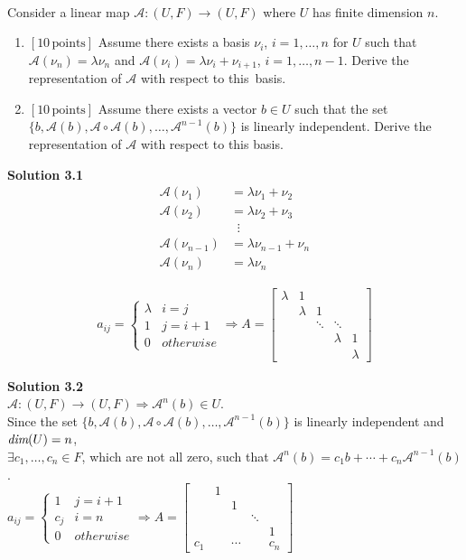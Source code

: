 \documentclass[a4paper,10.5pt]{article}
\def\dim{{\mbox{\em dim}}}
\newcommand{\A}{\mathcal{A}}
\begin{document}
\\
Consider a linear map $\A:(U,F) \rightarrow (U,F)$
where $U$ has finite dimension $n$. 
\begin{enumerate}
	\item {\bf$[10\, \text{points}]$} Assume there exists a basis
	$\nu_i$, $i=1, \ldots, n$ for $U$ such that ${\mathcal A}(\nu_n)=\lambda
	\nu_n$ and ${\mathcal A}(\nu_i)=\lambda \nu_i+\nu_{i+1}$, $i=1, \ldots,
	n-1$. Derive the representation of ${\mathcal A}$ with respect to this~basis.
	\item {\bf$[10\, \text{points}]$} Assume there exists a vector $b
	\in U$ such that the set $\{b, {\mathcal A}(b), {\mathcal
		A}\circ {\mathcal A}(b), \ldots, {\mathcal A}^{n-1}(b)\}$ is linearly independent. Derive the representation of ${\mathcal A}$
	with respect to this basis.\\
\end{enumerate}

{\bf Solution 3.1} \\
\begin{align*}
\A(\nu_1) &= \lambda \nu_1 + \nu_2 \\
\A(\nu_2) &= \lambda \nu_2 + \nu_3 \\
		  &\; \; \vdots \\
\A(\nu_{n-1}) &= \lambda \nu_{n-1} + \nu_n \\
\A(\nu_n) &= \lambda \nu_n
\end{align*}

\begin{align*}
a_{ij} = \begin{cases}
\lambda & i = j \\
1 & j = i + 1 \\
0 & otherwise
\end{cases} \Rightarrow A = \left[\begin{matrix}
\lambda & 1 & & & \\
& \lambda &1 & & \\
& & \ddots &\ddots & \\
& & & \lambda & 1 \\
& & & & \lambda
\end{matrix}\right]
\end{align*}


{\bf Solution 3.2} \\

$\A:(U,F) \rightarrow (U,F) \Rightarrow \A^n(b) \in U$. \\
Since the set $\{b, {\A}(b), {\A} \circ {\A}(b), \ldots, {\A}^{n-1}(b)\}$ is linearly independent and $\dim(U) = n$, \\
$\exists c_1,\dots,c_n \in F$, which are not all zero, such that $\A^n(b) = c_1b + \cdots + c_n\A^{n-1}(b)$. \\

$a_{ij} = \begin{cases}
1 & j = i + 1 \\
c_j & i = n \\
0 & otherwise
\end{cases} \Rightarrow A = \left[\begin{matrix}
 & 1 & & & \\
&  &1 & & \\
& &  &\ddots & \\
& & &  & 1 \\
c_1 & & \cdots & & c_n
\end{matrix}\right]$
\end{document}

